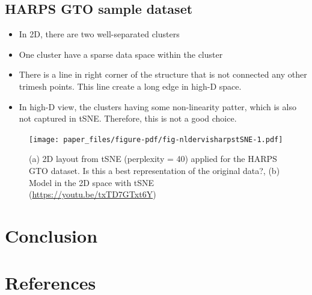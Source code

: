 \documentclass[
  12pt]{article}
\begin{document}
\hypertarget{harps-gto-sample-dataset}{%
\subsection{HARPS GTO sample dataset}\label{harps-gto-sample-dataset}}

\begin{itemize}
\item
  In 2D, there are two well-separated clusters
\item
  One cluster have a sparse data space within the cluster
\item
  There is a line in right corner of the structure that is not connected
  any other trimesh points. This line create a long edge in high-D
  space.
\item
  In high-D view, the clusters having some non-linearity patter, which
  is also not captured in tSNE. Therefore, this is not a good choice.
\end{itemize}

\begin{figure}

{\centering \texttt{[image: paper\_files/figure-pdf/fig-nldervisharpstSNE-1.pdf]}

}

\caption{\label{fig-nldervisharpstSNE}(a) 2D layout from tSNE
(perplexity = 40) applied for the HARPS GTO dataset. Is this a best
representation of the original data?, (b) Model in the 2D space with
tSNE (\url{https://youtu.be/txTD7GTxt6Y})}

\end{figure}

\hypertarget{sec-conclusion}{%
\section{Conclusion}\label{sec-conclusion}}

\hypertarget{references}{%
\section*{References}\label{references}}

\renewcommand{\bibsection}{}


\newpage{}
\end{document}
